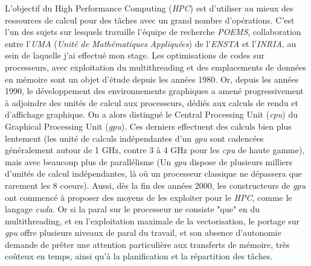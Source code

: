 \documentclass{article}
\begin{document}
L'objectif du High Performance Computing (\textit{HPC}) est d'utiliser au mieux des ressources de calcul pour des tâches avec un grand nombre d'opérations. C'est l'un des sujets sur lesquels travaille l'équipe de recherche \textit{POEMS}, collaboration entre l'\textit{UMA} (\textit{Unité de Mathématiques Appliquées}) de l'\textit{ENSTA} et l'\textit{INRIA}, au sein de laquelle j'ai effectué mon stage. Les optimisations de codes sur processeurs, avec exploitation du multithreading et des emplacements de données en mémoire sont un objet d'étude depuis les années 1980. Or, depuis les années 1990, le développement des environnements graphiques a amené progressivement à adjoindre des unités de calcul aux processeurs, dédiés aux calculs de rendu et d'affichage graphique. On a alors distingué le Central Processing Unit (\textit{\gls{cpu}}) du Graphical Processing Unit (\textit{\gls{gpu}}). Ces derniers effectuent des calculs bien plus lentement (les unité de calculs indépendantes d'un \textit{\gls{gpu}} sont cadencées généralement autour de 1 GHz, contre 3 à 4 GHz pour les \textit{\gls{cpu}} de haute gamme), mais avec beaucoup plus de parallélisme (Un \textit{\gls{gpu}} dispose de plusieurs milliers d'unités de calcul indépendantes, là où un processeur classique ne dépassera que rarement les 8 \gls{coeur}s). Aussi, dès la fin des années 2000, les constructeurs de \textit{\gls{gpu}} ont commencé à proposer des moyens de les exploiter pour le \textit{HPC}, comme le langage \textit{\gls{cuda}}. Or si la \gls{paral} sur le processeur ne consiste "que" en du multithreading, et en l'exploitation maximale de la vectorisation, le portage sur \textit{\gls{gpu}} offre plusieurs niveaux de \gls{paral} du travail, et son absence d'autonomie demande de prêter une attention particulière aux transferts de mémoire, très coûteux en temps, ainsi qu'à la planification et la répartition des tâches.



\end{document}
